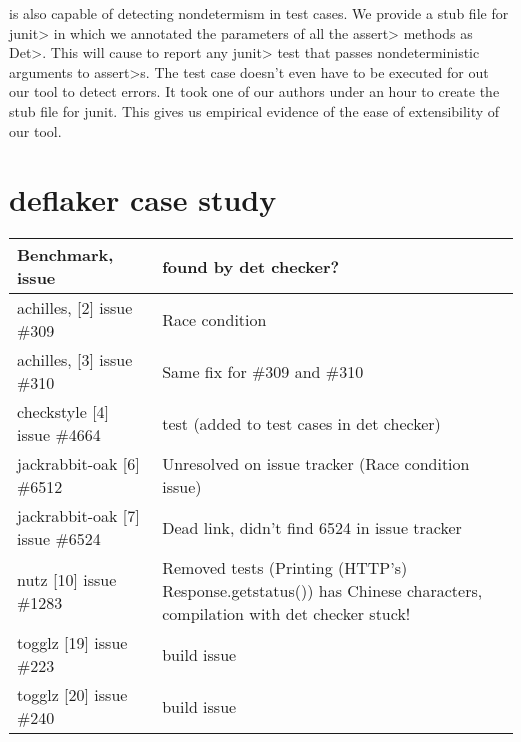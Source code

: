 \TheDeterminismChecker is also capable of detecting nondetermism in test cases. We provide a stub file
for \<junit> in which we annotated the parameters of all the \<assert> methods as \<Det>.
This will cause \TheDeterminismChecker to report any \<junit> test that passes nondeterministic arguments to 
\<assert>s. The test case doesn't even have to be executed for out our tool to detect errors.
It took one of our authors under an hour to create the stub file for junit. This gives us
empirical evidence of the ease of extensibility of our tool.


\section{deflaker case study}
\begin{table}[]
    \begin{tabular}{|l|p{5cm}|}
        \hline
        Benchmark, issue & found by det checker? \\ \hline
        achilles, [2] issue \#309 &  Race condition\\ \hline
        achilles, [3] issue \#310 & Same fix for \#309 and \#310 \\ \hline
        checkstyle [4] issue \#4664&test (added to test cases in det checker) \\ \hline
        jackrabbit-oak [6] \#6512&  Unresolved on issue tracker (Race condition issue) \\ \hline
        jackrabbit-oak [7] issue \#6524&  Dead link, didn't find 6524 in issue tracker \\ \hline
        nutz [10] issue \#1283 &  Removed tests (Printing (HTTP's) Response.getstatus()) has Chinese characters,
        compilation with det checker stuck!\\ \hline
        togglz [19] issue \#223 & build issue \\ \hline
        togglz [20] issue \#240 &  build issue\\ \hline
    \end{tabular}
\end{table}
